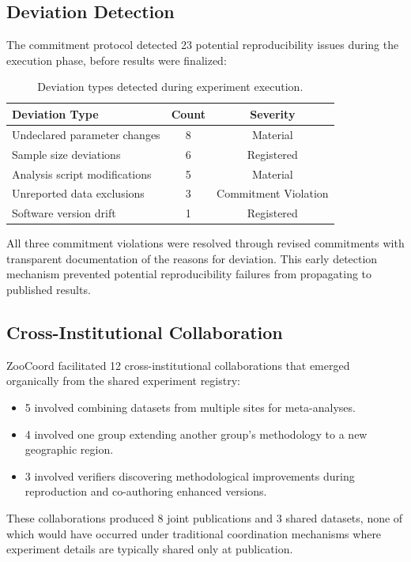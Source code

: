 \subsection{Deviation Detection}

The commitment protocol detected 23 potential reproducibility issues during the execution phase, before results were finalized:

\begin{table}[H]
\centering
\caption{Deviation types detected during experiment execution.}
\label{tab:deviations}
\begin{tabular}{@{}lcc@{}}
\toprule
\textbf{Deviation Type} & \textbf{Count} & \textbf{Severity} \\
\midrule
Undeclared parameter changes & 8 & Material \\
Sample size deviations & 6 & Registered \\
Analysis script modifications & 5 & Material \\
Unreported data exclusions & 3 & Commitment Violation \\
Software version drift & 1 & Registered \\
\bottomrule
\end{tabular}
\end{table}

All three commitment violations were resolved through revised commitments with transparent documentation of the reasons for deviation.
This early detection mechanism prevented potential reproducibility failures from propagating to published results.

\subsection{Cross-Institutional Collaboration}

ZooCoord facilitated 12 cross-institutional collaborations that emerged organically from the shared experiment registry:

\begin{itemize}[leftmargin=*]
    \item 5 involved combining datasets from multiple sites for meta-analyses.
    \item 4 involved one group extending another group's methodology to a new geographic region.
    \item 3 involved verifiers discovering methodological improvements during reproduction and co-authoring enhanced versions.
\end{itemize}

These collaborations produced 8 joint publications and 3 shared datasets, none of which would have occurred under traditional coordination mechanisms where experiment details are typically shared only at publication.

